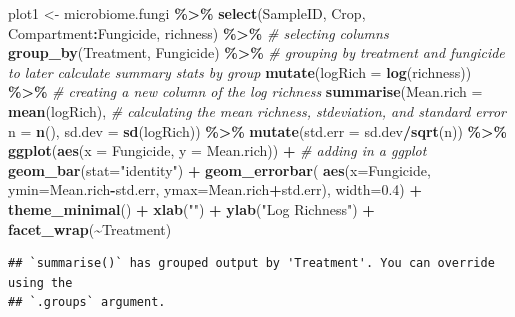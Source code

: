 \documentclass[
]{article}
\newenvironment{Shaded}{\begin{snugshade}}{\end{snugshade}}
\newcommand{\AttributeTok}[1]{\textcolor[rgb]{0.13,0.29,0.53}{#1}}
\newcommand{\CommentTok}[1]{\textcolor[rgb]{0.56,0.35,0.01}{\textit{#1}}}
\newcommand{\FloatTok}[1]{\textcolor[rgb]{0.00,0.00,0.81}{#1}}
\newcommand{\FunctionTok}[1]{\textcolor[rgb]{0.13,0.29,0.53}{\textbf{#1}}}
\newcommand{\NormalTok}[1]{#1}
\newcommand{\OtherTok}[1]{\textcolor[rgb]{0.56,0.35,0.01}{#1}}
\newcommand{\SpecialCharTok}[1]{\textcolor[rgb]{0.81,0.36,0.00}{\textbf{#1}}}
\newcommand{\StringTok}[1]{\textcolor[rgb]{0.31,0.60,0.02}{#1}}
\begin{document}
\begin{Shaded}
\begin{Highlighting}[]
\NormalTok{plot1 }\OtherTok{\textless{}{-}}\NormalTok{ microbiome.fungi }\SpecialCharTok{\%\textgreater{}\%}
  \FunctionTok{select}\NormalTok{(SampleID, Crop, Compartment}\SpecialCharTok{:}\NormalTok{Fungicide, richness) }\SpecialCharTok{\%\textgreater{}\%} \CommentTok{\# selecting columns}
  \FunctionTok{group\_by}\NormalTok{(Treatment, Fungicide) }\SpecialCharTok{\%\textgreater{}\%} \CommentTok{\# grouping by treatment and fungicide to later calculate summary stats by group}
  \FunctionTok{mutate}\NormalTok{(}\AttributeTok{logRich =} \FunctionTok{log}\NormalTok{(richness)) }\SpecialCharTok{\%\textgreater{}\%} \CommentTok{\# creating a new column of the log richness}
  \FunctionTok{summarise}\NormalTok{(}\AttributeTok{Mean.rich =} \FunctionTok{mean}\NormalTok{(logRich), }\CommentTok{\# calculating the mean richness, stdeviation, and standard error}
            \AttributeTok{n =} \FunctionTok{n}\NormalTok{(), }
            \AttributeTok{sd.dev =} \FunctionTok{sd}\NormalTok{(logRich)) }\SpecialCharTok{\%\textgreater{}\%}
  \FunctionTok{mutate}\NormalTok{(}\AttributeTok{std.err =}\NormalTok{ sd.dev}\SpecialCharTok{/}\FunctionTok{sqrt}\NormalTok{(n)) }\SpecialCharTok{\%\textgreater{}\%}
  \FunctionTok{ggplot}\NormalTok{(}\FunctionTok{aes}\NormalTok{(}\AttributeTok{x =}\NormalTok{ Fungicide, }\AttributeTok{y =}\NormalTok{ Mean.rich)) }\SpecialCharTok{+} \CommentTok{\# adding in a ggplot}
  \FunctionTok{geom\_bar}\NormalTok{(}\AttributeTok{stat=}\StringTok{"identity"}\NormalTok{) }\SpecialCharTok{+}
  \FunctionTok{geom\_errorbar}\NormalTok{( }\FunctionTok{aes}\NormalTok{(}\AttributeTok{x=}\NormalTok{Fungicide, }\AttributeTok{ymin=}\NormalTok{Mean.rich}\SpecialCharTok{{-}}\NormalTok{std.err, }\AttributeTok{ymax=}\NormalTok{Mean.rich}\SpecialCharTok{+}\NormalTok{std.err), }\AttributeTok{width=}\FloatTok{0.4}\NormalTok{) }\SpecialCharTok{+}
  \FunctionTok{theme\_minimal}\NormalTok{() }\SpecialCharTok{+}
  \FunctionTok{xlab}\NormalTok{(}\StringTok{""}\NormalTok{) }\SpecialCharTok{+}
  \FunctionTok{ylab}\NormalTok{(}\StringTok{"Log Richness"}\NormalTok{) }\SpecialCharTok{+}
  \FunctionTok{facet\_wrap}\NormalTok{(}\SpecialCharTok{\textasciitilde{}}\NormalTok{Treatment)}
\end{Highlighting}
\end{Shaded}

\begin{verbatim}
## `summarise()` has grouped output by 'Treatment'. You can override using the
## `.groups` argument.
\end{verbatim}
\end{document}
